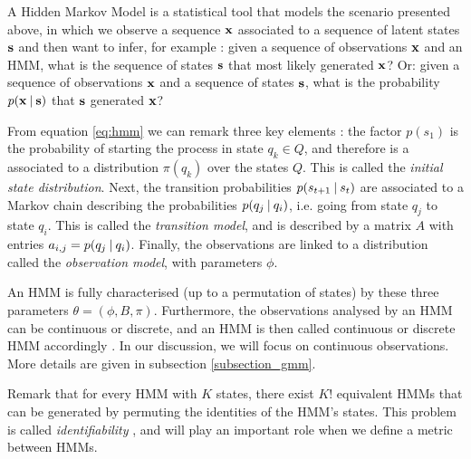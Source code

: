 \documentclass[../main.tex]{subfiles}
\begin{document}
\par A Hidden Markov Model is a statistical tool that models the scenario presented above, in which we observe a sequence $\mathbf{x}$ associated to a sequence of latent states $\mathbf{s}$ and then want to infer, for example \cite{Jurafsky2009, Bishop2006}: given a sequence of observations $\mathbf{x}$ and an HMM, what is the sequence of states $\mathbf{s}$ that most likely generated $\mathbf{x}$? Or: given a sequence of observations $\mathbf{x}$ and a sequence of states $\mathbf{s}$, what is the probability $p(\mathbf{x} \:\vert\: \mathbf{s})$ that $\mathbf{s}$ generated $\mathbf{x}$?  
\par From equation \ref{eq:hmm} we can remark three key elements \cite{Ghahramani2001}: the factor $p(s_1)$ is the probability of starting the process in state $q_k \in Q$, and therefore is a associated to a distribution $\pi(q_k)$ over the states $Q$. This is called the \emph{initial state distribution}. Next, the transition probabilities $p(s_{t+1} \:\vert\: s_t)$ are associated to a Markov chain describing the probabilities $p(q_j \:\vert\: q_i)$, i.e. going from state $q_j$ to state $q_i$. This is called the \emph{transition model}, and is described by a matrix $A$ with entries $a_{i,j} = p(q_j \:\vert\: q_i)$. Finally, the observations are linked to a distribution called the \emph{observation model}, with parameters $\phi$. 
\par An HMM is fully characterised (up to a permutation of states) by these three parameters $\theta = (\phi, B, \pi)$. Furthermore, the observations analysed by an HMM can be continuous or discrete, and an HMM is then called continuous or discrete HMM accordingly \cite{Jurafsky2009}. In our discussion, we will focus on continuous observations. More details are given in subsection \ref{subsection_gmm}.
\par Remark that for every HMM with $K$ states, there exist $K!$ equivalent HMMs that can be generated by permuting the identities of the HMM's states. This problem is called \emph{identifiability} \cite{Bishop2006}, and will play an important role when we define a metric between HMMs. 
\end{document}
